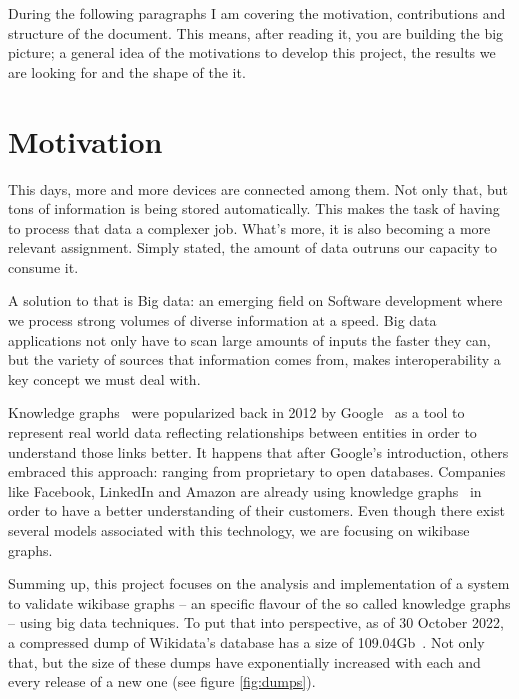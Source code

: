 During the following paragraphs I am covering the motivation, contributions and structure of the document. This means, after reading it, you are building the big picture; a general idea of the motivations to develop this project, the results we are looking for and the shape of the it.

\section{Motivation}

This days, more and more devices are connected among them. Not only that, but tons of information is being stored automatically. This makes the task of having to process that data a complexer job. What's more, it is also becoming a more relevant assignment. Simply stated, the amount of data outruns our capacity to consume it.

A solution to that is Big data: an emerging field on Software development where we process strong volumes of diverse information at a speed. Big data applications not only have to scan large amounts of inputs the faster they can, but the variety of sources that information comes from, makes interoperability a key concept we must deal with.

Knowledge graphs~\cite{https://doi.org/10.48550/arxiv.2110.11709} were popularized back in 2012 by Google~\cite{web:knowledge_graphs:google} as a tool to represent real world data reflecting relationships between entities in order to understand those links better. It happens that after Google's introduction, others embraced this approach: ranging from proprietary to open databases. Companies like Facebook, LinkedIn and Amazon are already using knowledge graphs~\cite{web:knowledge_graphs:use} in order to have a better understanding of their customers. Even though there exist several models associated with this technology, we are focusing on wikibase graphs.

Summing up, this project focuses on the analysis and implementation of a system to validate wikibase graphs -- an specific flavour of the so called knowledge graphs -- using big data techniques. To put that into perspective, as of 30 October 2022, a compressed dump of Wikidata's database has a size of 109.04Gb~\cite{wikidata:dumps}. Not only that, but the size of these dumps have exponentially increased with each and every release of a new one (see figure \ref{fig:dumps}).

